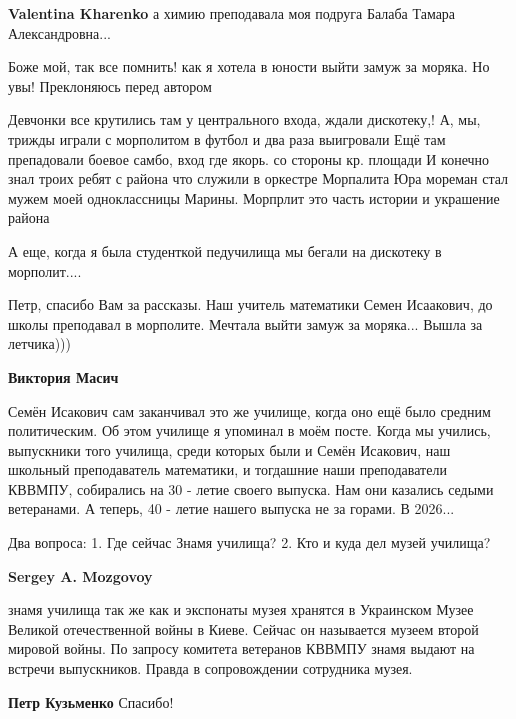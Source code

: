 \begin{itemize}
\begin{itemize}
\textbf{Valentina Kharenko} а химию преподавала моя подруга Балаба Тамара Александровна...
\end{itemize} %

Боже мой, так все помнить! как я хотела в юности выйти замуж за моряка. Но увы!
Преклоняюсь перед автором

Девчонки все крутились там у центрального входа, ждали дискотеку,!  А, мы, трижды
играли с морполитом в футбол и два раза выигровали Ещё там препадовали боевое
самбо, вход где якорь. со стороны кр. площади И конечно знал троих ребят с района
что служили в оркестре Морпалита Юра мореман стал мужем моей одноклассницы
Марины. Морпрлит это часть истории и украшение района

А еще, когда я была студенткой педучилища мы бегали на дискотеку в морполит....


Петр, спасибо Вам за рассказы. Наш учитель математики Семен Исаакович, до школы
преподавал в морполите. Мечтала выйти замуж за моряка... Вышла за летчика)))

\begin{itemize} %
\textbf{Виктория Масич} 

Семён Исакович сам заканчивал это же училище, когда оно ещё было средним
политическим. Об этом училище я упоминал в моём посте. Когда мы учились,
выпускники того училища, среди которых были и Семён Исакович, наш школьный
преподаватель математики, и тогдашние наши преподаватели КВВМПУ, собирались на
30 - летие своего выпуска. Нам они казались седыми ветеранами. А теперь, 40 -
летие нашего выпуска не за горами. В 2026...

\end{itemize} %

Два вопроса: 1. Где сейчас Знамя училища? 2. Кто и куда дел музей училища?

\begin{itemize} %
\textbf{Sergey A. Mozgovoy} 

знамя училища так же как и экспонаты музея хранятся в Украинском Музее Великой
отечественной войны в Киеве. Сейчас он называется музеем второй мировой войны.
По запросу комитета ветеранов КВВМПУ знамя выдают на встречи выпускников.
Правда в сопровождении сотрудника музея.


\textbf{Петр Кузьменко} Спасибо!
\end{itemize} %


\end{itemize}

